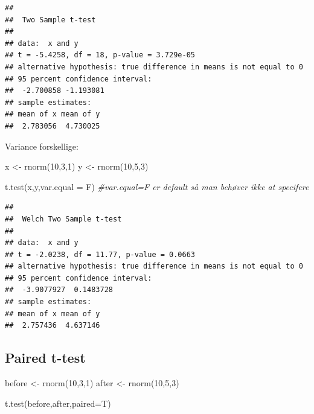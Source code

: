 \documentclass[
]{book}
\newenvironment{Shaded}{\begin{snugshade}}{\end{snugshade}}
\newcommand{\AttributeTok}[1]{\textcolor[rgb]{0.77,0.63,0.00}{#1}}
\newcommand{\CommentTok}[1]{\textcolor[rgb]{0.56,0.35,0.01}{\textit{#1}}}
\newcommand{\DecValTok}[1]{\textcolor[rgb]{0.00,0.00,0.81}{#1}}
\newcommand{\FunctionTok}[1]{\textcolor[rgb]{0.00,0.00,0.00}{#1}}
\newcommand{\NormalTok}[1]{#1}
\newcommand{\OtherTok}[1]{\textcolor[rgb]{0.56,0.35,0.01}{#1}}
\begin{document}
\begin{verbatim}
## 
##  Two Sample t-test
## 
## data:  x and y
## t = -5.4258, df = 18, p-value = 3.729e-05
## alternative hypothesis: true difference in means is not equal to 0
## 95 percent confidence interval:
##  -2.700858 -1.193081
## sample estimates:
## mean of x mean of y 
##  2.783056  4.730025
\end{verbatim}

Variance forskellige:

\begin{Shaded}
\begin{Highlighting}[]
\NormalTok{x }\OtherTok{\textless{}{-}} \FunctionTok{rnorm}\NormalTok{(}\DecValTok{10}\NormalTok{,}\DecValTok{3}\NormalTok{,}\DecValTok{1}\NormalTok{)}
\NormalTok{y }\OtherTok{\textless{}{-}} \FunctionTok{rnorm}\NormalTok{(}\DecValTok{10}\NormalTok{,}\DecValTok{5}\NormalTok{,}\DecValTok{3}\NormalTok{)}

\FunctionTok{t.test}\NormalTok{(x,y,}\AttributeTok{var.equal =}\NormalTok{ F) }\CommentTok{\#var.equal=F er \textquotesingle{}default\textquotesingle{} så man behøver ikke at specifere}
\end{Highlighting}
\end{Shaded}

\begin{verbatim}
## 
##  Welch Two Sample t-test
## 
## data:  x and y
## t = -2.0238, df = 11.77, p-value = 0.0663
## alternative hypothesis: true difference in means is not equal to 0
## 95 percent confidence interval:
##  -3.9077927  0.1483728
## sample estimates:
## mean of x mean of y 
##  2.757436  4.637146
\end{verbatim}

\hypertarget{paired-t-test}{%
\subsection{Paired t-test}\label{paired-t-test}}

\begin{Shaded}
\begin{Highlighting}[]
\NormalTok{before }\OtherTok{\textless{}{-}} \FunctionTok{rnorm}\NormalTok{(}\DecValTok{10}\NormalTok{,}\DecValTok{3}\NormalTok{,}\DecValTok{1}\NormalTok{)}
\NormalTok{after }\OtherTok{\textless{}{-}} \FunctionTok{rnorm}\NormalTok{(}\DecValTok{10}\NormalTok{,}\DecValTok{5}\NormalTok{,}\DecValTok{3}\NormalTok{)}

\FunctionTok{t.test}\NormalTok{(before,after,}\AttributeTok{paired=}\NormalTok{T)}
\end{Highlighting}
\end{Shaded}
\end{document}
